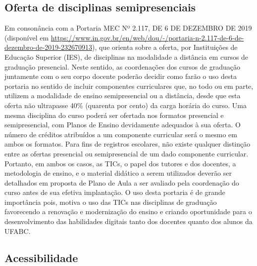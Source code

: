 \subsection{Oferta de disciplinas semipresenciais}

Em consonância com a Portaria MEC Nº 2.117, DE 6 DE DEZEMBRO DE 2019 (disponível em \url{https://www.in.gov.br/en/web/dou/-/portaria-n-2.117-de-6-de-dezembro-de-2019-232670913}), que orienta sobre a oferta, por Instituições de Educação Superior (IES), de disciplinas na modalidade a distância em cursos de graduação presencial. Neste sentido, as coordenações dos cursos de graduação juntamente com o seu corpo docente poderão decidir como farão o uso desta portaria no sentido de incluir componentes curriculares que, no todo ou em parte, utilizem a modalidade de ensino semipresencial ou a distância, desde que esta oferta não ultrapasse 40\% (quarenta por cento) da carga horária do curso. Uma mesma disciplina do curso poderá ser ofertada nos formatos presencial e semipresencial, com Planos de Ensino devidamente adequados à sua oferta. O número de créditos atribuídos a um componente curricular será o mesmo em ambos os formatos. Para fins de registros escolares, não existe qualquer distinção entre as ofertas presencial ou semipresencial de um dado componente curricular. Portanto, em ambos os casos, as TICs, o papel dos tutores e dos docentes, a metodologia de ensino, e o material didático a serem utilizados deverão ser detalhados em proposta de Plano de Aula a ser avaliado pela coordenação do curso antes de sua efetiva implantação. O uso desta portaria é de grande importância pois, motiva o uso das TICs nas disciplinas de graduação favorecendo a renovação e modernização do ensino e criando oportunidade para o desenvolvimento das habilidades digitais tanto dos docentes quanto dos alunos da UFABC.

\subsection{Acessibilidade}

